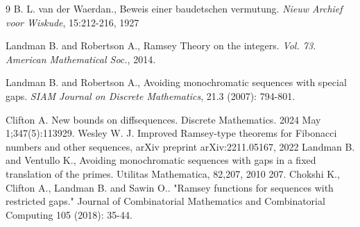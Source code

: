 \documentclass[11pt]{article}
\begin{document}
\begin{thebibliography}{9}
        {\sc B. L. van der Waerdan.,}
        Beweis einer baudetschen vermutung. {\em Nieuw Archief voor Wiskude}, 15:212-216, 1927

        {\sc Landman B.} and {\sc Robertson A.,} Ramsey Theory on the integers. {\em Vol. 73. American Mathematical Soc.}, 2014.
    
        {\sc Landman B.} and {\sc Robertson A.,} Avoiding monochromatic sequences with special gaps. {\em SIAM Journal on Discrete Mathematics}, 21.3 (2007): 794-801.

        {\sc Clifton A.} New bounds on diffsequences. Discrete Mathematics. 2024 May 1;347(5):113929.
        {\sc Wesley W. J.} Improved Ramsey-type theorems for Fibonacci numbers and other sequences,  arXiv preprint arXiv:2211.05167, 2022
        {\sc Landman B.} and {\sc Ventullo K.,}
        Avoiding monochromatic sequences with gaps in a fixed translation of the primes. Utilitas Mathematica, 82,207, 2010 207.
        {\sc Chokshi K.,} {\sc Clifton A.,}  {\sc Landman B.} and  {\sc Sawin O.}. "Ramsey functions for sequences with restricted gaps." Journal of Combinatorial Mathematics and Combinatorial Computing 105 (2018): 35-44.

\end{thebibliography}
\end{document}
